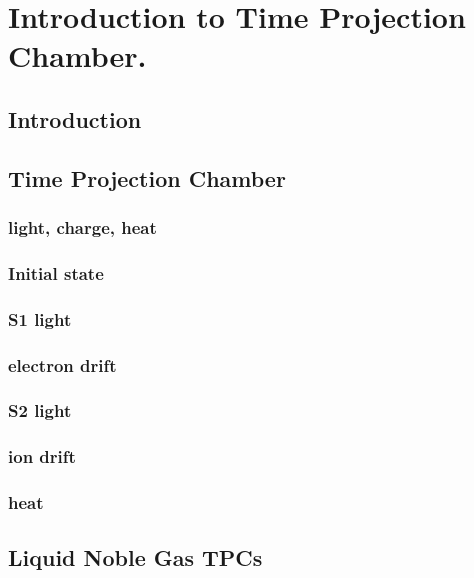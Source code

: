 \label{Chapter1}
\chapter{Introduction to Time Projection Chamber.}  

\section{Introduction}

\section{Time Projection Chamber}
\subsection{light, charge, heat}
\subsection{Initial state}
\subsection{S1 light}
\subsection{electron drift}
\subsection{S2 light}
\subsection{ion drift}
\subsection{heat}
\subsection{}
\section{Liquid Noble Gas TPCs}
